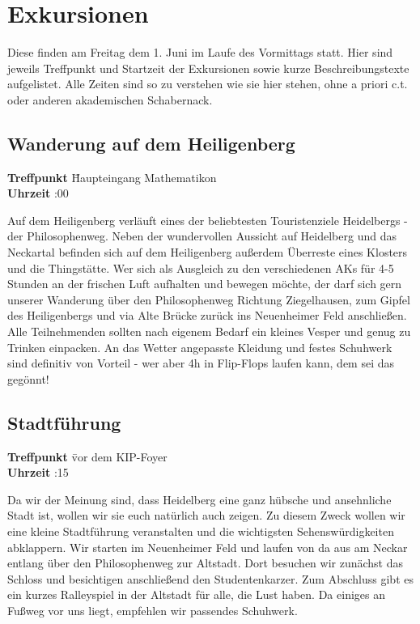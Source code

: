 
\section{Exkursionen}

Diese finden am Freitag dem 1. Juni im Laufe des Vormittags statt.
Hier sind jeweils Treffpunkt und Startzeit der Exkursionen sowie kurze Beschreibungstexte aufgelistet.
Alle Zeiten sind so zu verstehen wie sie hier stehen, ohne a priori c.t. oder anderen akademischen Schabernack.

\subsection*{Wanderung auf dem Heiligenberg}
\begin{tabbing}
\textbf{Treffpunkt} \quad \quad \quad \= Haupteingang Mathematikon\\
\textbf{Uhrzeit} :00
\end{tabbing}%
Auf dem Heiligenberg verläuft eines der beliebtesten Touristenziele Heidelbergs - der Philosophenweg. Neben der wundervollen Aussicht auf Heidelberg und das Neckartal befinden sich auf dem Heiligenberg außerdem Überreste eines Klosters und die Thingstätte. Wer sich als Ausgleich zu den verschiedenen AKs für 4-5 Stunden an der frischen Luft aufhalten und bewegen möchte, der darf sich gern unserer Wanderung über den Philosophenweg Richtung Ziegelhausen, zum Gipfel des Heiligenbergs und via Alte Brücke zurück ins Neuenheimer Feld anschließen. Alle Teilnehmenden sollten nach eigenem Bedarf ein kleines Vesper und genug zu Trinken einpacken. An das Wetter angepasste Kleidung und festes Schuhwerk sind definitiv von Vorteil - wer aber 4h in Flip-Flops laufen kann, dem sei das gegönnt! 

\subsection*{Stadtführung}
\begin{tabbing}
\textbf{Treffpunkt} \quad \quad \quad \= vor dem KIP-Foyer\\
\textbf{Uhrzeit} :15
\end{tabbing}%
Da wir der Meinung sind, dass Heidelberg eine ganz hübsche und ansehnliche Stadt ist, wollen wir sie euch natürlich auch zeigen. Zu diesem Zweck wollen wir eine kleine Stadtführung veranstalten und die wichtigsten Sehenswürdigkeiten abklappern. Wir starten im  Neuenheimer Feld und laufen von da aus am Neckar entlang über den Philosophenweg zur Altstadt. Dort besuchen wir zunächst das Schloss und besichtigen anschließend den Studentenkarzer. Zum Abschluss gibt es ein kurzes Ralleyspiel in der Altstadt für alle, die Lust haben. Da einiges an Fußweg vor uns liegt, empfehlen wir passendes Schuhwerk. 

